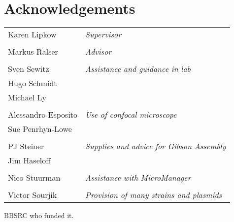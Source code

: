\documentclass[../main.tex]{subfiles}
\begin{document}
\section*{Acknowledgements}

\begin{tabular}{p{5cm}l}
Karen Lipkow					&	\textit{Supervisor}\\&\\
Markus Ralser				&	\textit{Advisor}\\&\\
Sven Sewitz					& 	{\textit{Assistance and guidance in lab}}\\
Hugo Schmidt					&	\\
Michael Ly					&	\\&\\
Alessandro Esposito			&	{\textit{Use of confocal microscope}}\\
Sue Penrhyn-Lowe				&	\\&\\
PJ Steiner					&	{\textit{Supplies and advice for Gibson Assembly}}\\
Jim Haseloff					&	\\&\\
Nico Stuurman				&	\textit{Assistance with MicroManager}\\&\\
Victor Sourjik				&	\textit{Provision of many strains and plasmids}
\end{tabular}

BBSRC who funded it.
\end{document}
